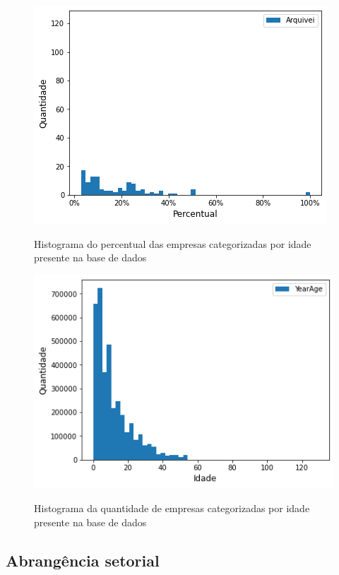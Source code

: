 \begin{figure}[htb]
	\centering
    \caption{Histograma do percentual das empresas categorizadas por idade presente na base de dados}
    \includegraphics[scale=0.7]{images/base-de-dados-10.1-presenca-por-idade.png}
    \label{fig:base-de-dados:descritiva-10.1-presenca-por-idade}
    \fautor
\end{figure}

\begin{figure}[htb]
	\centering
    \caption{Histograma da quantidade de empresas categorizadas por idade presente na base de dados}
    \includegraphics[scale=0.7]{images/base-de-dados-10.2-qtde-por-idade.png}
    \label{fig:base-de-dados:descritiva-10.2-qtde-por-idade}
    \fautor
\end{figure}

\subsection{Abrangência setorial}

